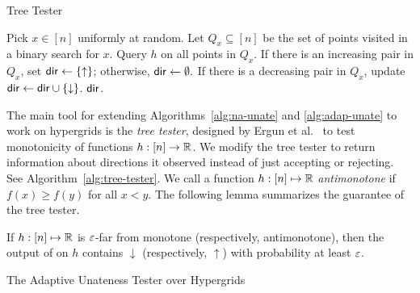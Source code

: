 \begin{algorithm}
\caption{Tree Tester}\label{alg:tree-tester}
\DontPrintSemicolon
\BlankLine

\nl Pick $x \in [n]$ uniformly at random. \;
\nl Let $Q_x\subseteq [n]$ be the set of points visited in a binary search for $x$. Query $h$ on all points in $Q_x$. \;
\nl If there is an increasing pair in $Q_x$, set $\mathsf{dir} \gets \{\uparrow\}$; otherwise, $\mathsf{dir}\gets\emptyset.$\;
\nl If there is a decreasing pair in $Q_x$, update $\mathsf{dir} \gets\mathsf{dir} \cup \{\downarrow\}$. \;
 $\mathsf{dir}$.
\end{algorithm}

The main tool for extending Algorithms~\ref{alg:na-unate} and \ref{alg:adap-unate} to work on hypergrids is the {\em tree tester}, designed by Ergun et al.~\cite{EKKRV00} to test monotonicity of functions $h:[n]\to{\mathbb R}$.
We modify the tree tester to return information about directions it observed instead of just accepting or rejecting. See Algorithm~\ref{alg:tree-tester}. 
We call a function $h:[n] \mapsto {\mathbb R}$ \emph{antimonotone} if $f(x) \geq f(y)$ for all $x < y$.
The following lemma summarizes the guarantee of the tree tester.

\begin{lemma} \label{lem:line}
If $h:[n] \mapsto {\mathbb R}$ is $\varepsilon$-far from monotone (respectively, antimonotone), then the output of  on $h$ contains $\downarrow$ (respectively, $\uparrow$) with probability at least $\varepsilon$.
\end{lemma}

\begin{algorithm}
\caption{The Adaptive Unateness Tester over Hypergrids} \label{alg:adap-unate-hg}
\DontPrintSemicolon
\BlankLine
\nl {}
\end{algorithm}

